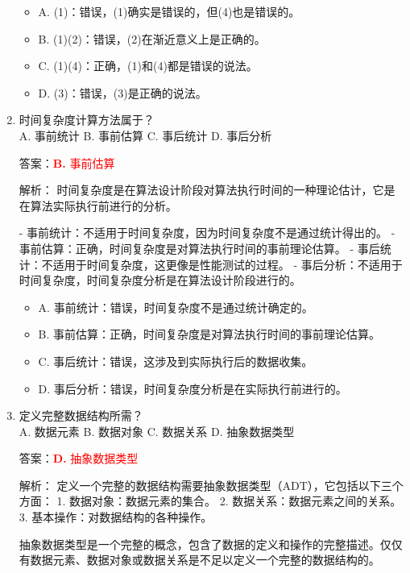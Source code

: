 \documentclass[lang=cn,newtx,10pt,scheme=chinese]{../../../elegantbook}
\begin{document}
\begin{enumerate}
    \begin{itemize}
        \item A. (1)：错误，(1)确实是错误的，但(4)也是错误的。
        \item B. (1)(2)：错误，(2)在渐近意义上是正确的。
        \item C. (1)(4)：正确，(1)和(4)都是错误的说法。
        \item D. (3)：错误，(3)是正确的说法。
    \end{itemize}

    \item 时间复杂度计算方法属于？\\
    A. 事前统计 \quad B. 事前估算 \quad C. 事后统计 \quad D. 事后分析

    答案：\textcolor{red}{\textbf{B.} 事前估算}

    解析：
    时间复杂度是在算法设计阶段对算法执行时间的一种理论估计，它是在算法实际执行前进行的分析。
    
    - 事前统计：不适用于时间复杂度，因为时间复杂度不是通过统计得出的。
    - 事前估算：正确，时间复杂度是对算法执行时间的事前理论估算。
    - 事后统计：不适用于时间复杂度，这更像是性能测试的过程。
    - 事后分析：不适用于时间复杂度，时间复杂度分析是在算法设计阶段进行的。

    \begin{itemize}
        \item A. 事前统计：错误，时间复杂度不是通过统计确定的。
        \item B. 事前估算：正确，时间复杂度是对算法执行时间的事前理论估算。
        \item C. 事后统计：错误，这涉及到实际执行后的数据收集。
        \item D. 事后分析：错误，时间复杂度分析是在实际执行前进行的。
    \end{itemize}

    \item 定义完整数据结构所需？\\
    A. 数据元素 \quad B. 数据对象 \quad C. 数据关系 \quad D. 抽象数据类型

    答案：\textcolor{red}{\textbf{D.} 抽象数据类型}

    解析：
    定义一个完整的数据结构需要抽象数据类型（ADT），它包括以下三个方面：
    1. 数据对象：数据元素的集合。
    2. 数据关系：数据元素之间的关系。
    3. 基本操作：对数据结构的各种操作。
    
    抽象数据类型是一个完整的概念，包含了数据的定义和操作的完整描述。仅仅有数据元素、数据对象或数据关系是不足以定义一个完整的数据结构的。


\end{enumerate}
\end{document}

